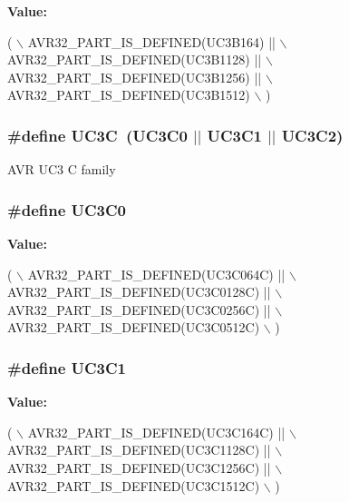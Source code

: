 {\bfseries Value\-:}
\begin{DoxyCode}
(       \(\backslash\)
                AVR32\_PART\_IS\_DEFINED(UC3B164)  || \(\backslash\)
                AVR32\_PART\_IS\_DEFINED(UC3B1128) || \(\backslash\)
                AVR32\_PART\_IS\_DEFINED(UC3B1256) || \(\backslash\)
                AVR32\_PART\_IS\_DEFINED(UC3B1512) \(\backslash\)
                )
\end{DoxyCode}
\hypertarget{group__uc3__part__macros__group_gac7a13b9ceb67804d94b6a8967512ee71}{
\subsubsection[{U\-C3\-C}]{\setlength{\rightskip}{0pt plus 5cm}\#define U\-C3\-C~(U\-C3\-C0 $|$$|$ U\-C3\-C1 $|$$|$ U\-C3\-C2)}}\label{group__uc3__part__macros__group_gac7a13b9ceb67804d94b6a8967512ee71}
A\-V\-R U\-C3 C family \hypertarget{group__uc3__part__macros__group_ga4519bacce7868e73227b94af6e2a1b7f}{
\subsubsection[{U\-C3\-C0}]{\setlength{\rightskip}{0pt plus 5cm}\#define U\-C3\-C0}}\label{group__uc3__part__macros__group_ga4519bacce7868e73227b94af6e2a1b7f}
{\bfseries Value\-:}
\begin{DoxyCode}
(       \(\backslash\)
                AVR32\_PART\_IS\_DEFINED(UC3C064C)  || \(\backslash\)
                AVR32\_PART\_IS\_DEFINED(UC3C0128C) || \(\backslash\)
                AVR32\_PART\_IS\_DEFINED(UC3C0256C) || \(\backslash\)
                AVR32\_PART\_IS\_DEFINED(UC3C0512C) \(\backslash\)
                )
\end{DoxyCode}
\hypertarget{group__uc3__part__macros__group_ga775cb0ff401f59a6062a4513ce6a65e6}{
\subsubsection[{U\-C3\-C1}]{\setlength{\rightskip}{0pt plus 5cm}\#define U\-C3\-C1}}\label{group__uc3__part__macros__group_ga775cb0ff401f59a6062a4513ce6a65e6}
{\bfseries Value\-:}
\begin{DoxyCode}
(       \(\backslash\)
                AVR32\_PART\_IS\_DEFINED(UC3C164C)  || \(\backslash\)
                AVR32\_PART\_IS\_DEFINED(UC3C1128C) || \(\backslash\)
                AVR32\_PART\_IS\_DEFINED(UC3C1256C) || \(\backslash\)
                AVR32\_PART\_IS\_DEFINED(UC3C1512C) \(\backslash\)
                )
\end{DoxyCode}
